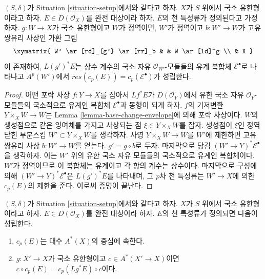 \begin{lemma}
\label{lemma-chern-classes-computed}
$(S, \delta)$가 Situation \ref{situation-setup}에서와 같다고 하자.
$X$가 $S$ 위에서 국소 유한형이라고 하자.
$E \in D(\mathcal{O}_X)$를 완전 대상이라 하자. $E$의 천 특성류가
정의된다고 가정하자. $g : W \to X$가 국소 유한형이고 $W$가 정역이면,
$W'$가 정역이고 $b : W' \to W$가 고유 쌍유리 사상인 가환 그림
$$
\xymatrix{
W' \ar[rd]_{g'} \ar[rr]_b & & W \ar[ld]^g \\
& X
}
$$
이 존재하여, $L(g')^*E$는 상수 계수의 국소 자유
$\mathcal{O}_{W'}$-모듈들의 유계 복합체 $\mathcal{E}^\bullet$로
나타나고 $A^p(W')$에서
$res(c_p(E)) = c_p(\mathcal{E}^\bullet)$가 성립한다.
\end{lemma}

\begin{proof}
어떤 포락 사상 $f : Y \to X$를 잡아서 $Lf^*E$가
$D(\mathcal{O}_Y)$에서 유한 국소 자유 $\mathcal{O}_Y$-모듈들의
국소적으로 유계인 복합체 $\mathcal{E}^\bullet$과 동형이 되게 하자.
$f$의 기저변환 $Y \times_X W \to W$는 Lemma
\ref{lemma-base-change-envelope}에 의해 포락 사상이다.
$W$의 생성점으로 같은 잉여체를 가지고 사상되는 점
$\xi \in Y \times_X W$를 잡자. 생성점이 $\xi$인 정역 닫힌 부분스킴
$W' \subset Y \times_X W$를 생각하자. 사영
$Y \times_X W \to W$를 $W'$에 제한하면 고유 쌍유리 사상
$b : W' \to W$를 얻는다. $g' = g \circ b$로 두자. 마지막으로
당김 $(W' \to Y)^*\mathcal{E}^\bullet$을 생각하자. 이는 $W'$ 위의
유한 국소 자유 모듈들의 국소적으로 유계인 복합체이다. $W'$가
정역이므로 이 복합체는 유계이고 각 항의 계수는 상수이다.
마지막으로 구성에 의해 $(W' \to Y)^*\mathcal{E}^\bullet$은
$L(g')^*E$를 나타내며, 그 $p$차 천 특성류는 $W' \to X$에 의한
$c_p(E)$의 제한을 준다. 이로써 증명이 끝난다.
\end{proof}

\begin{lemma}
\label{lemma-commutative-chern-perfect}
$(S, \delta)$가 Situation \ref{situation-setup}에서와 같다고 하자.
$X$가 $S$ 위에서 국소 유한형이라고 하자.
$E \in D(\mathcal{O}_X)$를 완전 대상이라 하자. $E$의 천 특성류가
정의되면 다음이 성립한다.
\begin{enumerate}
\item $c_p(E)$는 대수 $A^*(X)$의 중심에 속한다.
\item $g : X' \to X$가 국소 유한형이고 $c \in A^*(X' \to X)$이면
$c \circ c_p(E) = c_p(Lg^*E) \circ c$이다.
\end{enumerate}
\end{lemma}

